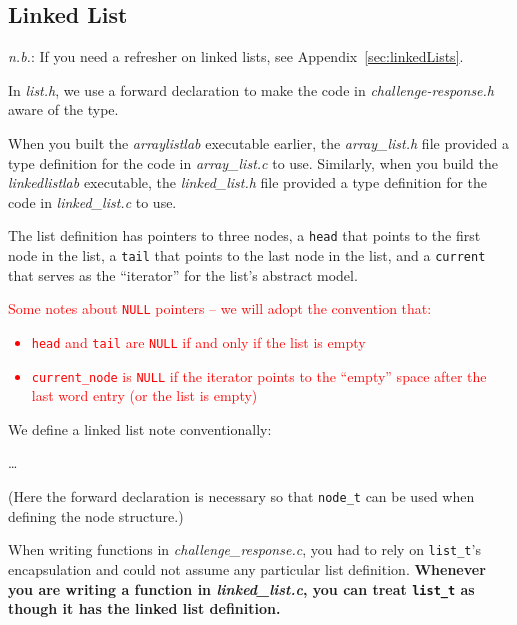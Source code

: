 \subsection{Linked List} \label{subsec:LinkedList}

\textit{n.b.}: If you need a refresher on linked lists, see Appendix~\ref{sec:linkedLists}.

In \textit{list.h}, we use a forward declaration to make the code in \textit{challenge-response.h} aware of the type.



When you built the \textit{arraylistlab} executable earlier, the \textit{array\_list.h} file provided a type definition for the code in \textit{array\_list.c} to use.
Similarly, when you build the \textit{linkedlistlab} executable, the \textit{linked\_list.h} file provided a type definition for the code in \textit{linked\_list.c} to use.



The list definition has pointers to three nodes, a \lstinline{head} that points to the first node in the list, a \lstinline{tail} that points to the last node in the list, and a \lstinline{current} that serves as the ``iterator'' for the list's abstract model.
\textcolor{red}{
    Some notes about \lstinline{NULL} pointers -- we will adopt the convention that:
    \begin{itemize}
        \item \lstinline{head} and \lstinline{tail} are \lstinline{NULL} if and only if the list is empty
        \item \lstinline{current_node} is \lstinline{NULL} if the iterator points to the ``empty'' space after the last word entry (or the list is empty)
    \end{itemize}
}

We define a linked list note conventionally:


\dots


(Here the forward declaration is necessary so that \lstinline{node_t} can be used when defining the node structure.)

When writing functions in \textit{challenge\_response.c}, you had to rely on \lstinline{list_t}'s encapsulation and could not assume any particular list definition.
\textbf{Whenever you are writing a function in \textit{linked\_list.c}, you can treat \lstinline{list_t} as though it has the linked list definition.}


